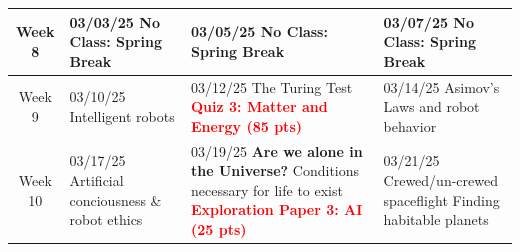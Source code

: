 \documentclass[11pt]{article}
\begin{document}
\begin{tabularx}{\textwidth}{|c|X|X|X|}

    \hline
    Week 8 & 
    
    \cellcolor{gray!20}03/03/25 \newline
    \textbf{No Class: Spring Break} 
    &
    
    \cellcolor{gray!20}03/05/25 \newline
    \textbf{No Class: Spring Break} 
    &

    \cellcolor{gray!20}03/07/25 \newline
    \textbf{No Class: Spring Break} 
    \\

    \hline
    Week 9 & 
    
    03/10/25 \newline
    \newline
    Intelligent robots \newline
    &
    
    03/12/25 \newline
    \newline
    The Turing Test \newline
    \textcolor{red}{\textbf{Quiz 3: Matter and Energy (85 pts)}} &

    03/14/25 \newline
    \newline
    Asimov's Laws and robot behavior \newline
    \\
    
    
    \hline
    Week 10 & 
    
    03/17/25 \newline
    \newline
    Artificial conciousness \& robot ethics \newline
    \newline
    &
    
    03/19/25 \newline
    \textbf{Are we alone in the Universe?}\newline
    Conditions necessary for life to exist\newline\newline
    \textcolor{red}{\textbf{Exploration Paper 3: AI (25 pts)}}
    &

    03/21/25 \newline
    \newline
    Crewed/un-crewed spaceflight\newline
    Finding habitable planets
    \newline
    \\


\end{tabularx}
\end{document}
